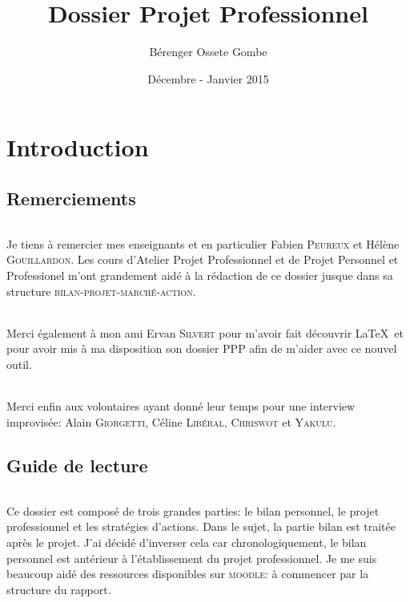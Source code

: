 \documentclass[a4paper,12pt, draft]{report}
\author{Bérenger Ossete Gombe}
\title{Dossier Projet Professionnel}
\date{Décembre - Janvier 2015}
\newcommand{\sommaire}{\shorttoc{Sommaire}{1}}
\begin{document}
\maketitle

\newpage
\sommaire{}

\newpage

\part{Introduction}

\chapter{Remerciements}
\paragraph{}
Je tiens à remercier mes enseignants et en particulier Fabien \textsc{Peureux} et Hélène \textsc{Gouillardon}. Les cours d'Atelier Projet Professionnel et de Projet Personnel et Professionel m'ont grandement aidé à la rédaction de ce dossier jusque dans sa structure \textsc{bilan-projet-marché-action}.

\paragraph{}
Merci également à mon ami Ervan \textsc{Silvert} pour m'avoir fait découvrir \LaTeX\ et pour avoir mis à ma disposition son dossier PPP afin de m'aider avec ce nouvel outil.

\paragraph{}
Merci enfin aux volontaires ayant donné leur temps pour une interview improvisée: Alain \textsc{Giorgetti}, Céline \textsc{Libéral}, \textsc{Chriswot} et \textsc{Yakulu}.

\chapter{Guide de lecture}
\paragraph{}
Ce dossier est composé de trois grandes parties: le bilan personnel, le projet professionnel et les stratégies d'actions. Dans le sujet, la partie bilan est traitée après le projet. J'ai décidé d'inverser cela car chronologiquement, le bilan personnel est antérieur à l'établissement du projet professionnel.
Je me suis beaucoup aidé des ressources disponibles sur \textsc{moodle}: à commencer par la structure du rapport.
\end{document}
